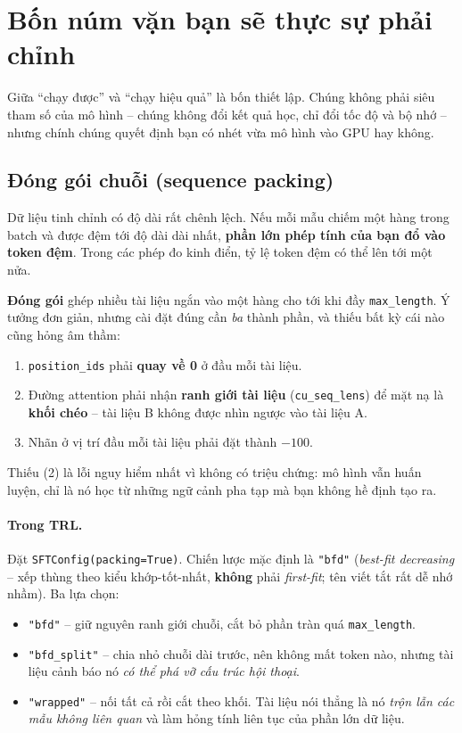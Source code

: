 
\section{Bốn núm vặn bạn sẽ thực sự phải chỉnh}
\label{sec:training_knobs}

Giữa “chạy được” và “chạy hiệu quả” là bốn thiết lập. Chúng không phải siêu tham số của mô hình -- chúng không đổi kết quả học, chỉ đổi tốc độ và bộ nhớ -- nhưng chính chúng quyết định bạn có nhét vừa mô hình vào GPU hay không.

\subsection{Đóng gói chuỗi (sequence packing)}
\label{ssec:packing}

Dữ liệu tinh chỉnh có độ dài rất chênh lệch. Nếu mỗi mẫu chiếm một hàng trong batch và được đệm tới độ dài dài nhất, \textbf{phần lớn phép tính của bạn đổ vào token đệm}. Trong các phép đo kinh điển, tỷ lệ token đệm có thể lên tới một nửa.

\textbf{Đóng gói} ghép nhiều tài liệu ngắn vào một hàng cho tới khi đầy \texttt{max\_length}. Ý tưởng đơn giản, nhưng cài đặt đúng cần \emph{ba} thành phần, và thiếu bất kỳ cái nào cũng hỏng âm thầm:

\begin{enumerate}
	\item \texttt{position\_ids} phải \textbf{quay về 0} ở đầu mỗi tài liệu.
	\item Đường attention phải nhận \textbf{ranh giới tài liệu} (\texttt{cu\_seq\_lens}) để mặt nạ là \textbf{khối chéo} -- tài liệu B không được nhìn ngược vào tài liệu A.
	\item Nhãn ở vị trí đầu mỗi tài liệu phải đặt thành $-100$.
\end{enumerate}

Thiếu (2) là lỗi nguy hiểm nhất vì không có triệu chứng: mô hình vẫn huấn luyện, chỉ là nó học từ những ngữ cảnh pha tạp mà bạn không hề định tạo ra.

\paragraph{Trong TRL.} Đặt \texttt{SFTConfig(\allowbreak packing=True)}. Chiến lược mặc định là \texttt{"bfd"} (\emph{best-fit decreasing} -- xếp thùng theo kiểu khớp-tốt-nhất, \textbf{không} phải \emph{first-fit}; tên viết tắt rất dễ nhớ nhầm). Ba lựa chọn:
\begin{itemize}
	\item \texttt{"bfd"} -- giữ nguyên ranh giới chuỗi, cắt bỏ phần tràn quá \texttt{max\_length}.
	\item \texttt{"bfd\_split"} -- chia nhỏ chuỗi dài trước, nên không mất token nào, nhưng tài liệu cảnh báo nó \emph{có thể phá vỡ cấu trúc hội thoại}.
	\item \texttt{"wrapped"} -- nối tất cả rồi cắt theo khối. Tài liệu nói thẳng là nó \emph{trộn lẫn các mẫu không liên quan} và làm hỏng tính liên tục của phần lớn dữ liệu.
\end{itemize}

